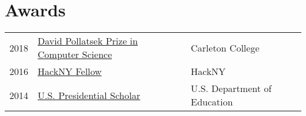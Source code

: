\documentclass{resume}
\begin{document}
\begin{minipage}[t]{0.66\textwidth}

\section{Awards}
\begin{tabular}{rll}
  2018 & \href{https://www.carleton.edu/computer-science/major/awards/pollatsek/}{David Pollatsek Prize in Computer Science} & Carleton College \\
  2016 & \href{https://hackny.org/about}{HackNY Fellow} & HackNY \\
  2014 & \href{https://en.wikipedia.org/wiki/Presidential_Scholars_Program}{U.S. Presidential Scholar} & U.S. Department of Education \\
\end{tabular}
\sectionsep

\end{minipage}
\end{document}
